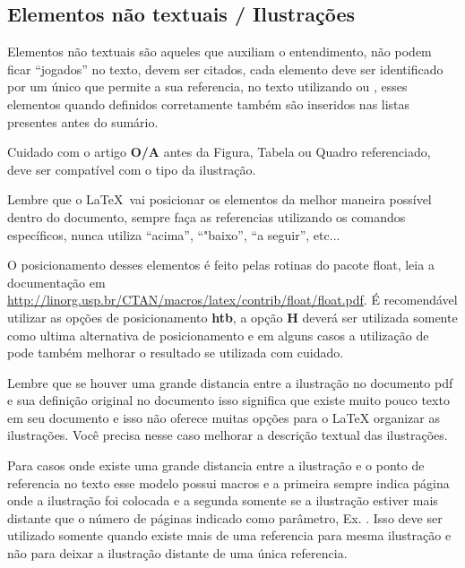 



\subsection{Elementos não textuais / Ilustrações}
\label{elementos-nao-textuais}

Elementos não textuais são aqueles que auxiliam o entendimento, não podem ficar \enquote{jogados} no texto, devem ser citados, cada elemento deve ser identificado por um  único que permite a sua referencia, no texto utilizando  ou , esses elementos quando definidos corretamente também são inseridos nas listas presentes antes do sumário.

Cuidado com o artigo \textbf{O/A} antes da Figura, Tabela ou Quadro referenciado, deve ser compatível com o tipo da ilustração.

Lembre que o \LaTeX \  vai posicionar os elementos  da melhor maneira possível dentro do documento, sempre faça as referencias utilizando os comandos específicos, nunca utiliza \enquote{acima}, \enquote{"baixo}, \enquote{a seguir}, etc... 

O posicionamento desses elementos é feito pelas rotinas do pacote float, leia a documentação em  \url{http://linorg.usp.br/CTAN/macros/latex/contrib/float/float.pdf}. É recomendável utilizar as opções de posicionamento \textbf{htb}, a opção \textbf{H} deverá ser utilizada somente como ultima alternativa de posicionamento e em alguns casos a utilização de  pode também melhorar o resultado se utilizada com cuidado.

Lembre que se houver uma grande distancia entre a ilustração no documento \ac{pdf} e sua definição original no documento isso significa que existe muito pouco texto em seu documento e isso não oferece muitas opções para o {\LaTeX} organizar as ilustrações. Você precisa nesse caso melhorar a descrição textual das ilustrações.


Para casos onde existe uma grande distancia entre a ilustração e o ponto de referencia no texto esse modelo possui macros  e  a primeira sempre indica página onde a ilustração foi colocada e a segunda somente se a ilustração estiver mais distante que o número de páginas indicado como parâmetro, Ex. . Isso deve ser utilizado somente quando existe mais de uma referencia para mesma ilustração e não para deixar a ilustração distante de uma única referencia.

